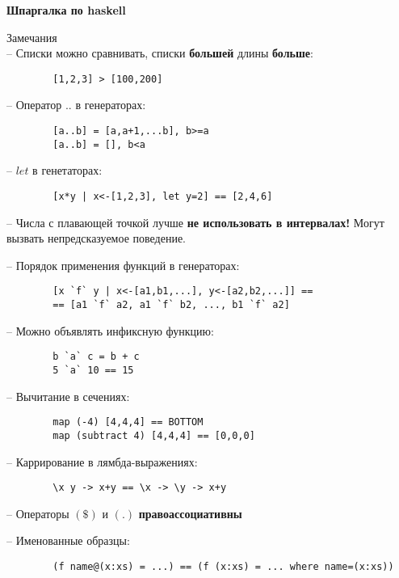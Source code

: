 \documentclass{article}
\begin{document}
    \huge{\textbf{Шпаргалка по haskell}}\\\small
    
    \large{Замечания}\small\\
    
    -- Списки можно сравнивать, списки \textbf{большей} длины \textbf{больше}:
    \begin{verbatim}
        [1,2,3] > [100,200]
    \end{verbatim}
    
    -- Оператор $..$ в генераторах:
    \begin{verbatim}
        [a..b] = [a,a+1,...b], b>=a
        [a..b] = [], b<a
    \end{verbatim}
    
    -- $let$ в генетаторах:
    \begin{verbatim}
        [x*y | x<-[1,2,3], let y=2] == [2,4,6]
    \end{verbatim}
    
    -- Числа с плавающей точкой лучше \textbf{не использовать в интервалах!} Могут вызвать непредсказуемое поведение.
    
    -- Порядок применения функций в генераторах:
    \begin{verbatim}
        [x `f` y | x<-[a1,b1,...], y<-[a2,b2,...]] == 
        == [a1 `f` a2, a1 `f` b2, ..., b1 `f` a2]
    \end{verbatim}
    
    -- Можно объявлять инфиксную функцию:
    \begin{verbatim}
        b `a` c = b + c
        5 `a` 10 == 15
    \end{verbatim}
    
    -- Вычитание в сечениях:
    \begin{verbatim}
        map (-4) [4,4,4] == BOTTOM
        map (subtract 4) [4,4,4] == [0,0,0]    
    \end{verbatim}

    -- Каррирование в лямбда-выражениях:
    \begin{verbatim}
        \x y -> x+y == \x -> \y -> x+y
    \end{verbatim}
    
    -- Операторы $(\$)$ и $(.)$ \textbf{правоассоциативны}
    
    -- Именованные образцы:
    \begin{verbatim}
        (f name@(x:xs) = ...) == (f (x:xs) = ... where name=(x:xs))
    \end{verbatim}
    
\end{document}
